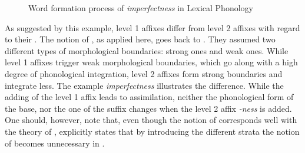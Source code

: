 \begin{figure*}
{}
	\caption{Word formation process of \textit{imperfectness} in Lexical Phonology\label{fig:Word Formation Process imperfectness}}
\end{figure*}


As suggested by this example, level 1 affixes differ from level 2 affixes with regard to their . The notion of , as applied here, goes back to \cite{Chomsky.1968}. They assumed two different types of morphological boundaries: strong ones and weak ones.  While level 1 affixes trigger weak morphological boundaries, which go along with a high degree of phonological integration, level 2 affixes form strong boundaries and integrate less. The example \textit{imperfectness}  illustrates the difference. While the adding of the level 1 affix  leads to assimilation, neither the phonological  form of the base, nor the one of the suffix changes when the level 2 affix \textit{-ness} is added. One should, however, note that, even though the notion of  corresponds well with the theory of , \citet[239]{Kiparsky.1985} explicitly states that by introducing the different strata the notion of  becomes unnecessary in . 

